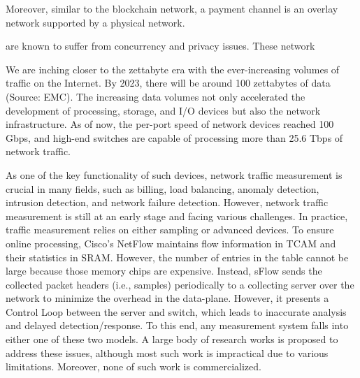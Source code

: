 \documentclass{NSF}
\begin{document}
Moreover, similar to the blockchain network, a payment channel is an overlay network supported by a physical network.

are known to suffer from concurrency and privacy issues. These network



We are inching closer to the zettabyte era with the ever-increasing volumes of traffic on the Internet. 
By 2023, there will be around 100 zettabytes of data (Source: EMC). 
The increasing data volumes not only accelerated the development of processing, storage, and I/O devices but also the network infrastructure. As of now, the per-port speed of network devices reached 100 Gbps, and high-end switches are capable of processing more than 25.6 Tbps of network traffic. 

As one of the key functionality of such devices, network traffic measurement is crucial in many fields, such as billing, load balancing, anomaly detection, intrusion detection, and network failure detection. However, network traffic measurement is still at an early stage and facing various challenges. 
In practice, traffic measurement relies on either sampling or advanced devices. To ensure online processing, Cisco's NetFlow maintains flow information in TCAM and their statistics in SRAM. However, the number of entries in the table cannot be large because those memory chips are expensive. Instead, sFlow sends the collected packet headers (i.e., samples) periodically to a collecting server over the network to minimize the overhead in the data-plane. However, it presents a Control Loop 
between the server and switch, which leads to inaccurate analysis and delayed detection/response. To this end, any measurement system falls into either one of these two models. 
A large body of research works is proposed to address these issues, although most such work is impractical due to various limitations. Moreover, none of such work is commercialized.
\end{document}
